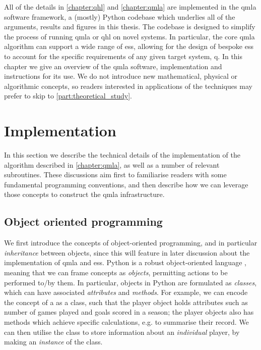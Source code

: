 \glsresetall

All of the details in \cref{chapter:qhl} and \cref{chapter:qmla} are implemented in the \gls{qmla}
    software framework, a (mostly) Python codebase which underlies all of the 
    arguments, results and figures in this thesis. 
The codebase is designed to simplify the process of running \gls{qmla} or \gls{qhl}
    on novel systems.
In particular, the core \gls{qmla} algorithm can support a wide range of \glspl{es}, 
    allowing for the design of bespoke \glspl{es} to account for the specific requirements 
    of any given target system, \gls{q}. 
In this chapter we give an overview of the \gls{qmla} software, 
    implementation and instructions for its use. 
We do not introduce new mathematical, physical or algorithmic concepts, 
    so readers interested in applications of the techniques may prefer to skip to \cref{part:theoretical_study}.

\section{Implementation}
In this section we describe the technical details of the implementation of the 
    algorithm described in \cref{chapter:qmla}, as well as a number of relevant subroutines. 
These discussions aim first to familiarise readers with some fundamental programming conventions,
    and then describe how we can leverage those concepts to construct the \gls{qmla} infrastructure.

\subsection{Object oriented programming}
We first introduce the concepts of object-oriented programming, 
    and in particular \emph{inheritance} between objects, 
    since this will feature in later discussion about the implementation of \gls{qmla}
    and \glspl{es}. 
Python is a robust object-oriented language \cite{python-manual}, meaning that we can frame 
    concepts as \emph{objects}, permitting actions to be performed to/by them. 
In particular, objects in Python are formulated as \emph{classes}, 
    which can have associated \emph{attributes} and \emph{methods}. 
For example, we can encode the concept of a  as a class,
    such that the player object holds attributes such as number of games played and goals scored in a season;
    the player objects also has methods which achieve specific calculations, 
    e.g. to summarise their record.
We can then utilise the  class to store information about an \emph{individual} player, 
    by making an \emph{instance} of the class.
\par 

